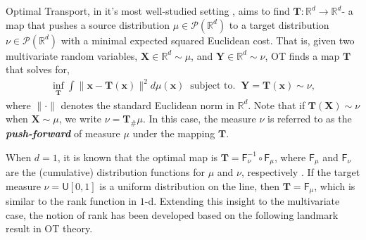 \documentclass{article}
\begin{document}
Optimal Transport, in it's most well-studied setting \cite{OTAM,peyre2019computational}, aims to find $ \mathbf{T}: \mathbb R^d \rightarrow \mathbb R^d$- a map that pushes a source distribution $\mu\in\mathcal P(\mathbb R^d)$ to a target distribution $\nu\in \mathcal P(\mathbb R^d)$ with a minimal expected squared Euclidean cost. That is, given two multivariate random variables, $\bm X\in \mathbb R^d \sim \mu$, and $\bm{Y}\in \mathbb R^d \sim \nu $, OT finds a map $\mathbf{T}$ that solves for,
{\small  
  \setlength{\abovedisplayskip}{2pt}
  \setlength{\belowdisplayskip}{\abovedisplayskip}
  \setlength{\abovedisplayshortskip}{0pt}
  \setlength{\belowdisplayshortskip}{3pt}
\begin{align}\label{monge}
   \inf_{\mathbf T} \int \|\bm x-\mathbf T(\bm x)\|^2 d\mu(\bm x) \;\; \text{subject to.}\;\; \bm{Y} = \mathbf{T}(\bm{x}) \sim \nu,
\end{align}}%
where $\|\cdot\|$ denotes the standard Euclidean norm in $\mathbb{R}^d$. Note that if $\mathbf T(\bm X) \sim \nu$ when $\bm X \sim \mu$, we write $\nu = \mathbf T_\#\mu$. In this case, the measure $\nu$ is referred to as the \textbf{\textit{push-forward}} of measure $\mu$ under the mapping $\mathbf{T}$. 

When $d=1$, it is known that the optimal map is $\mathbf{T} = \mathsf F_\nu^{-1} \circ \mathsf F_\mu$, where $\mathsf F_\mu$ and $\mathsf F_\nu$ are the (cumulative) distribution functions for $\mu$ and $\nu$, respectively \cite{OTAM, peyre2019computational}. If the target measure $\nu= \mathsf{U}[0, 1]$ is a uniform distribution on the line, then $\mathbf T = \mathsf F_\mu$, which is similar to the rank function in $1$-d. Extending this insight to the multivariate case, the notion of rank has been developed based on the following landmark result in OT theory.


\end{document}
